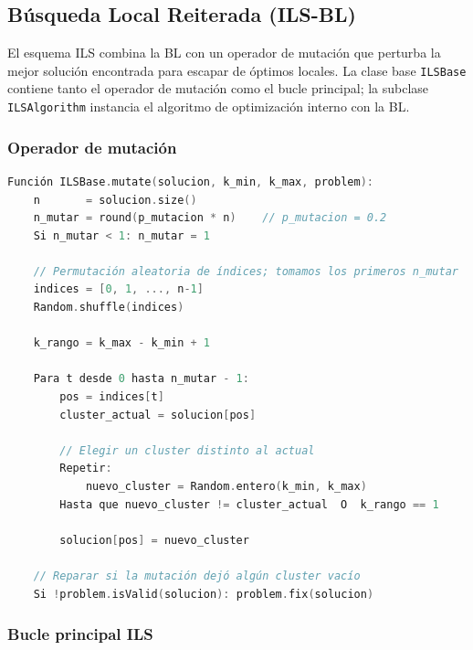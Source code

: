 \documentclass[12pt]{article}
\begin{document}
\subsection{Búsqueda Local Reiterada (ILS-BL)}
 
El esquema ILS combina la BL con un operador de mutación que perturba la mejor
solución encontrada para escapar de óptimos locales.  La clase base \texttt{ILSBase}
contiene tanto el operador de mutación como el bucle principal; la subclase
\texttt{ILSAlgorithm} instancia el algoritmo de optimización interno con la BL.
 
\subsubsection*{Operador de mutación}
 
\begin{lstlisting}[language=C++, mathescape=true,
    caption={Pseudocódigo del operador de mutación del ILS},
    label={lst:mutate}]
Función ILSBase.mutate(solucion, k_min, k_max, problem):
    n       = solucion.size()
    n_mutar = round(p_mutacion * n)    // p_mutacion = 0.2
    Si n_mutar < 1: n_mutar = 1
 
    // Permutación aleatoria de índices; tomamos los primeros n_mutar
    indices = [0, 1, ..., n-1]
    Random.shuffle(indices)
 
    k_rango = k_max - k_min + 1
 
    Para t desde 0 hasta n_mutar - 1:
        pos = indices[t]
        cluster_actual = solucion[pos]
 
        // Elegir un cluster distinto al actual
        Repetir:
            nuevo_cluster = Random.entero(k_min, k_max)
        Hasta que nuevo_cluster != cluster_actual  O  k_rango == 1
 
        solucion[pos] = nuevo_cluster
 
    // Reparar si la mutación dejó algún cluster vacío
    Si !problem.isValid(solucion): problem.fix(solucion)
\end{lstlisting}
 
\subsubsection*{Bucle principal ILS}
 
\end{document}
